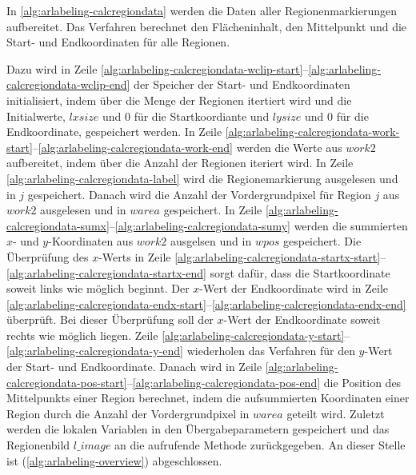 

In \autoref{alg:arlabeling-calcregiondata} werden die Daten aller Regionenmarkierungen aufbereitet. Das Verfahren
 berechnet den Flächeninhalt, den Mittelpunkt und die Start- und Endkoordinaten für alle Regionen.



Dazu wird in Zeile \ref{alg:arlabeling-calcregiondata-wclip-start}--\ref{alg:arlabeling-calcregiondata-wclip-end} der
 Speicher der Start- und Endkoordinaten initialisiert, indem über die Menge der Regionen itertiert wird und die
 Initialwerte, $\mathit{lxsize}$ und $0$ für die Startkoordiante und $\mathit{lysize}$ und $0$ für die Endkoordinate,
 gespeichert werden. In Zeile
 \ref{alg:arlabeling-calcregiondata-work-start}--\ref{alg:arlabeling-calcregiondata-work-end} werden die Werte aus
 $\mathit{work2}$ aufbereitet, indem über die Anzahl der Regionen iteriert wird. In Zeile
 \ref{alg:arlabeling-calcregiondata-label} wird die Regionemarkierung ausgelesen und in $j$ gespeichert. Danach wird
 die Anzahl der Vordergrundpixel für Region $j$ aus $\mathit{work2}$ ausgelesen und in $\mathit{warea}$ gespeichert. In
 Zeile \ref{alg:arlabeling-calcregiondata-sumx}--\ref{alg:arlabeling-calcregiondata-sumy} werden die summierten $x$- und
 $y$-Koordinaten aus $\mathit{work2}$ ausgelsen und in $\mathit{wpos}$ gespeichert. Die Überprüfung des $x$-Werts in
 Zeile \ref{alg:arlabeling-calcregiondata-startx-start}--\ref{alg:arlabeling-calcregiondata-startx-end} sorgt dafür,
 dass die Startkoordinate soweit links wie möglich beginnt. Der $x$-Wert der Endkoordinate wird in Zeile
 \ref{alg:arlabeling-calcregiondata-endx-start}--\ref{alg:arlabeling-calcregiondata-endx-end} überprüft. Bei dieser
 Überprüfung soll der $x$-Wert der Endkoordinate soweit rechts wie möglich liegen. Zeile
 \ref{alg:arlabeling-calcregiondata-y-start}--\ref{alg:arlabeling-calcregiondata-y-end} wiederholen das Verfahren für
 den $y$-Wert der Start- und Endkoordinate. Danach wird in Zeile
 \ref{alg:arlabeling-calcregiondata-pos-start}--\ref{alg:arlabeling-calcregiondata-pos-end} die Position des
 Mittelpunkts einer Region berechnet, indem die aufsummierten Koordinaten einer Region durch die Anzahl der
  Vordergrundpixel in $\mathit{warea}$ geteilt wird. Zuletzt werden die lokalen Variablen in den Übergabeparametern
 gespeichert und das Regionenbild $\mathit{l\_image}$ an die aufrufende Methode zurückgegeben. An dieser Stelle ist
  (\autoref{alg:arlabeling-overview}) abgeschlossen.

